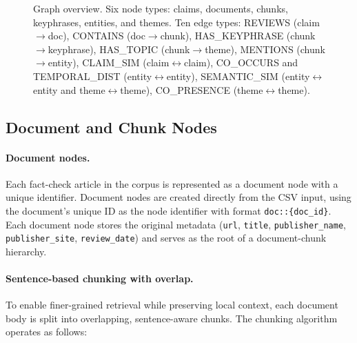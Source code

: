 \documentclass[10pt]{article}
\begin{document}
\begin{figure}[H]
    \caption{Graph overview. Six node types: claims, documents, chunks, keyphrases, entities, and themes. Ten edge types: REVIEWS (claim$\to$doc), CONTAINS (doc$\to$chunk), HAS\_KEYPHRASE (chunk$\to$keyphrase), HAS\_TOPIC (chunk$\to$theme), MENTIONS (chunk$\to$entity), CLAIM\_SIM (claim$\leftrightarrow$claim), CO\_OCCURS and TEMPORAL\_DIST (entity$\leftrightarrow$entity), SEMANTIC\_SIM (entity$\leftrightarrow$entity and theme$\leftrightarrow$theme), CO\_PRESENCE (theme$\leftrightarrow$theme).}
    \label{fig:graph_overview}
\end{figure}


\subsection{Document and Chunk Nodes}

\paragraph{Document nodes.} Each fact-check article in the corpus is represented as a document node with a unique identifier. Document nodes are created directly from the CSV input, using the document's unique ID as the node identifier with format \texttt{doc::\{doc\_id\}}. Each document node stores the original metadata (\texttt{url}, \texttt{title}, \texttt{publisher\_name}, \texttt{publisher\_site}, \texttt{review\_date}) and serves as the root of a document-chunk hierarchy.

\paragraph{Sentence-based chunking with overlap.} To enable finer-grained retrieval while preserving local context, each document body is split into overlapping, sentence-aware chunks. The chunking algorithm operates as follows:
\end{document}
